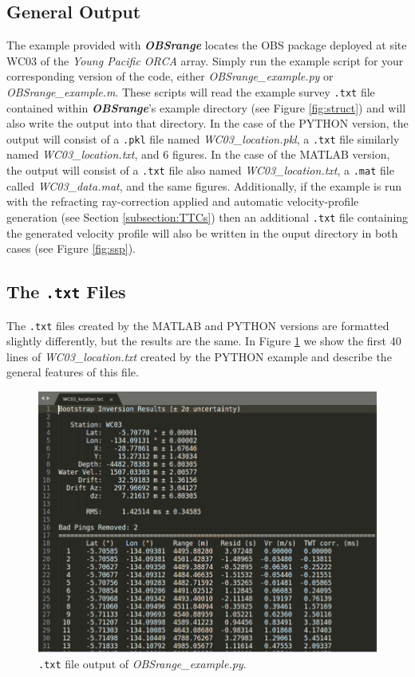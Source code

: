 \documentclass[titlepage, 12pt]{article}
\begin{document}
  \subsection{General Output}
  The example provided with \textbf{\textit{OBSrange}} locates the OBS package deployed at site WC03 of the \textit{Young Pacific ORCA} array. Simply run the example script for your corresponding version of the code, either \textit{OBSrange\_example.py} or \textit{OBSrange\_example.m}. These scripts will read the example survey \texttt{.txt} file contained within \textbf{\textit{OBSrange}}'s  example directory (see Figure \ref{fig:struct}) and will also write the output into that directory.  In the case of the PYTHON version, the output will consist of a \texttt{.pkl} file named \textit{WC03\_location.pkl}, a \texttt{.txt} file similarly named \textit{WC03\_location.txt}, and 6 figures. In the case of the MATLAB version, the output will consist of a \texttt{.txt} file also named \textit{WC03\_location.txt}, a \texttt{.mat} file called \textit{WC03\_data.mat}, and the same figures. Additionally, if the example is run with the refracting ray-correction applied and automatic velocity-profile generation (see Section \ref{subsection:TTCs}) then an additional \texttt{.txt} file containing the generated velocity profile will also be written in the ouput directory in both cases (see Figure \ref{fig:ssp}).

  \subsection{The \texttt{.txt} Files}
  The \texttt{.txt} files created by the MATLAB and PYTHON versions are formatted slightly differently, but the results are the same. In Figure \ref{fig:ex} we show the first 40 lines of \textit{WC03\_location.txt} created by the PYTHON example and describe the general features of this file.\\

  \begin{figure}[!htb]
   \includegraphics[width=\linewidth]{example_txt_fle.png}
   \caption{\texttt{.txt} file output of \textit{OBSrange\_example.py}.}
   \label{fig:ex}
  \end{figure}
\end{document}
